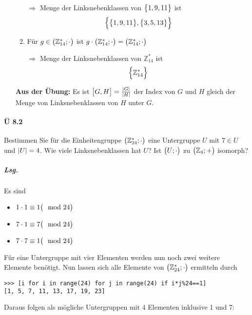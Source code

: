 \documentclass{scrreprt}
\begin{document}
\begin{enumerate}[(a)]
\begin{enumerate}[(1)]
    $\Rightarrow$ Menge der Linksnebenklassen von $\qty\big{1, 9, 11}$ ist
    \[
      \qty\Big{
        \qty\big{1, 9, 11},
        \qty\big{3, 5, 13}
      }
    \]

  \item Für $g \in \qty\big(\mathbb{Z}_{14}^*; \cdot)$ ist
    $g \cdot \qty\big(\mathbb{Z}_{14}^*; \cdot) = \qty\big(\mathbb{Z}_{14}^*; \cdot)$

    $\Rightarrow$ Menge der Linksnebenklassen von $\mathbb{Z}_{14}^*$ ist
    \[
      \qty\Big{\mathbb{Z}_{14}^*}
    \]

  \end{enumerate}

  \textbf{Aus der Übung:} Es ist $\qty\big[G, H] = \frac{\abs{G}}{\abs{H}}$
  der Index von $G$ und $H$ gleich der Menge von Linksnebenklassen von $H$
  unter $G$.
\end{enumerate}

\newpage
\paragraph{Ü 8.2} Bestimmen Sie für die Einheitengruppe
$\qty\big(\mathbb{Z}_{24}^*; \cdot)$ eine Untergruppe $U$ mit
$7 \in U$ und $\abs{U} = 4$.
Wie viele Linksnebenklassen hat $U$?
Ist $\qty\big(U; \cdot)$ zu $\qty\big(\mathbb{Z}_4; +)$ isomorph?

\subparagraph{Lsg.} Es sind
\begin{itemize}
\item $1 \cdot 1 \equiv 1 \qty\big(\mod 24)$
\item $7 \cdot 1 \equiv 7 \qty\big(\mod 24)$
\item $7 \cdot 7 \equiv 1 \qty\big(\mod 24)$
\end{itemize}
Für eine Untergruppe mit vier Elementen werden nun noch zwei weitere Elemente
benötigt.
Nun lassen sich alle Elemente von $\qty\big(\mathbb{Z}_{24}^*; \cdot)$
ermitteln durch
\begin{lstlisting}
>>> [i for i in range(24) for j in range(24) if i*j%24==1]
[1, 5, 7, 11, 13, 17, 19, 23]
\end{lstlisting}

Daraus folgen als mögliche Untergruppen mit 4 Elementen inklusive 1 und 7:
\end{document}

